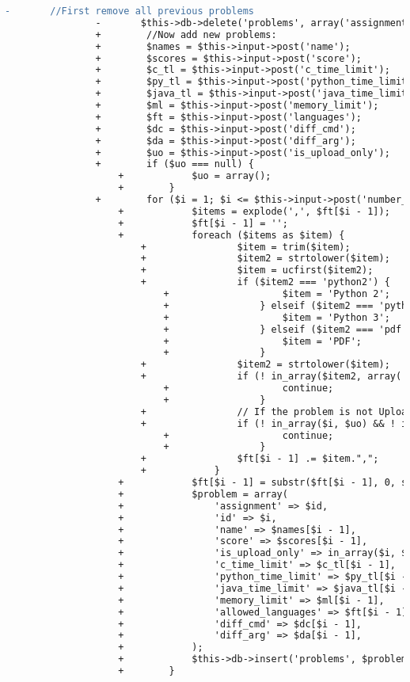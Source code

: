 \begin{lstlisting}[language=diff, caption=Perubahan pada kode Assignment\_model.php]
				-		//First remove all previous problems
				-		$this->db->delete('problems', array('assignment'=>$id));
				+        //Now add new problems:
				+        $names = $this->input->post('name');
				+        $scores = $this->input->post('score');
				+        $c_tl = $this->input->post('c_time_limit');
				+        $py_tl = $this->input->post('python_time_limit');
				+        $java_tl = $this->input->post('java_time_limit');
				+        $ml = $this->input->post('memory_limit');
				+        $ft = $this->input->post('languages');
				+        $dc = $this->input->post('diff_cmd');
				+        $da = $this->input->post('diff_arg');
				+        $uo = $this->input->post('is_upload_only');
				+        if ($uo === null) {
					+            $uo = array();
					+        }
				+        for ($i = 1; $i <= $this->input->post('number_of_problems'); $i++) {
					+            $items = explode(',', $ft[$i - 1]);
					+            $ft[$i - 1] = '';
					+            foreach ($items as $item) {
						+                $item = trim($item);
						+                $item2 = strtolower($item);
						+                $item = ucfirst($item2);
						+                if ($item2 === 'python2') {
							+                    $item = 'Python 2';
							+                } elseif ($item2 === 'python3') {
							+                    $item = 'Python 3';
							+                } elseif ($item2 === 'pdf') {
							+                    $item = 'PDF';
							+                }
						+                $item2 = strtolower($item);
						+                if (! in_array($item2, array('c','c++','python 2','python 3','java','zip','pdf','txt'))) {
							+                    continue;
							+                }
						+                // If the problem is not Upload-Only, its language should be one of {C,C++,Python 2, Python 3,Java}
						+                if (! in_array($i, $uo) && ! in_array($item2, array('c','c++','python 2','python 3','java'))) {
							+                    continue;
							+                }
						+                $ft[$i - 1] .= $item.",";
						+            }
					+            $ft[$i - 1] = substr($ft[$i - 1], 0, strlen($ft[$i - 1]) - 1); // remove last ','
					+            $problem = array(
					+                'assignment' => $id,
					+                'id' => $i,
					+                'name' => $names[$i - 1],
					+                'score' => $scores[$i - 1],
					+                'is_upload_only' => in_array($i, $uo) ? 1 : 0,
					+                'c_time_limit' => $c_tl[$i - 1],
					+                'python_time_limit' => $py_tl[$i - 1],
					+                'java_time_limit' => $java_tl[$i - 1],
					+                'memory_limit' => $ml[$i - 1],
					+                'allowed_languages' => $ft[$i - 1],
					+                'diff_cmd' => $dc[$i - 1],
					+                'diff_arg' => $da[$i - 1],
					+            );
					+            $this->db->insert('problems', $problem);
					+        }
				

\end{lstlisting}
